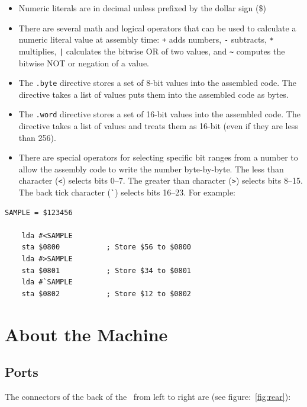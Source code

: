 \begin{itemize}
\item Numeric literals are in decimal unless prefixed by the dollar sign (\$)
\item There are several math and logical operators that can be used to calculate a numeric literal value at assembly time: \verb|+| adds numbers, \verb+-+ subtracts, \verb+*+ multiplies, \verb+|+ calculates the bitwise OR of two values, and \verb+~+ computes the bitwise NOT or negation of a value.
\item The \verb+.byte+ directive stores a set of 8-bit values into the assembled code. The directive takes a list of values puts them into the assembled code as bytes.
\item The \verb+.word+ directive stores a set of 16-bit values into the assembled code. The directive takes a list of values and treats them as 16-bit (even if they are less than 256).
\item There are special operators for selecting specific bit ranges from a number to allow the assembly code to write the number byte-by-byte. The less than character (\verb+<+) selects bits 0--7. The greater than character (\verb+>+) selects bits 8--15. The back tick character (\verb+`+) selects bits 16--23. For example:
\end{itemize}

\begin{Verbatim}[samepage=true]
    SAMPLE = $123456

    lda #<SAMPLE
    sta $0800           ; Store $56 to $0800
    lda #>SAMPLE
    sta $0801           ; Store $34 to $0801
    lda #`SAMPLE
    sta $0802           ; Store $12 to $0802
\end{Verbatim}

\section*{About the Machine}

\subsection*{Ports}

The connectors of the back of the \jr\ from left to right are (see figure:~\ref{fig:rear}):

